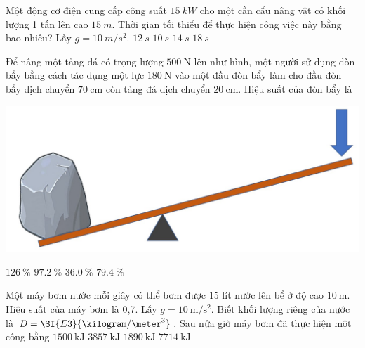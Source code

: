 \begin{ex}
	Một động cơ điện cung cấp công suất $\SI{15}{kW}$ cho một cần cẩu nâng vật có khối lượng 1 tấn lên cao $\SI{15}{m}$. Thời gian tối thiểu để thực hiện công việc này bằng bao nhiêu? Lấy $g=\SI{10}{m/s^2}$.
	\choice
	{$\SI{12}{s}$}
	{\True $\SI{10}{s}$}
	{$\SI{14}{s}$}
	{$\SI{18}{s}$}
\end{ex}
\begin{ex}
	Để nâng một tảng đá có trọng lượng $\SI{500}{\newton}$ lên như hình, một người sử dụng đòn bẩy bằng cách tác dụng một lực $\SI{180}{\newton}$ vào một đầu đòn bẩy làm cho đầu đòn bẩy dịch chuyển $\SI{70}{\centi\meter}$ còn tảng đá dịch chuyển $\SI{20}{\centi\meter}$. Hiệu suất của đòn bẩy là
	\begin{center}
		\includegraphics[width=0.4\linewidth]{../figs/VN10-2022-PH-TP023-P-12}
	\end{center}
	\choice
	{$\SI{126}{\percent}$}
	{$\SI{97.2}{\percent}$}
	{$\SI{36.0}{\percent}$}
	{\True $\SI{79.4}{\percent}$}
	\loigiai{}
\end{ex}

\begin{ex}
	Một máy bơm nước mỗi giây có thể bơm được 15 lít nước lên bể ở độ cao $\SI{10}{\meter}$. Hiệu suất của máy bơm là 0,7. Lấy $g=\SI{10}{\meter/\second^2}$. Biết khối lượng riêng của nước là  $D=\SI{E3}{\kilogram/\meter^3}$. Sau nửa giờ máy bơm đã thực hiện một công bằng	
	\choice
	{$\SI{1500}{\kilo\joule}$}
	{\True $\SI{3857}{\kilo\joule}$}
	{$\SI{1890}{\kilo\joule}$}
	{$\SI{7714}{\kilo\joule}$}
\end{ex}
